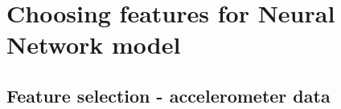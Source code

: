 
\section{Choosing features for Neural Network model}

\subsection{Feature selection - accelerometer data}